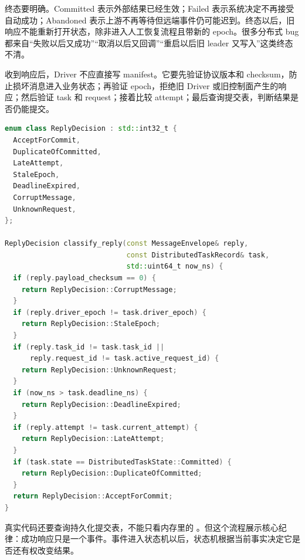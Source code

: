 终态要明确。Committed 表示外部结果已经生效；Failed 表示系统决定不再接受自动成功；Abandoned 表示上游不再等待但远端事件仍可能迟到。终态以后，旧响应不能重新打开状态，除非进入人工恢复流程且带新的 epoch。很多分布式 bug 都来自“失败以后又成功”“取消以后又回调”“重启以后旧 leader 又写入”这类终态不清。

收到响应后，Driver 不应直接写 manifest。它要先验证协议版本和 checksum，防止损坏消息进入业务状态；再验证 epoch，拒绝旧 Driver 或旧控制面产生的响应；然后验证 task 和 request；接着比较 attempt；最后查询提交表，判断结果是否仍能提交。

\begin{lstlisting}[language=C++,caption={响应进入状态机前的分类}]
enum class ReplyDecision : std::int32_t {
  AcceptForCommit,
  DuplicateOfCommitted,
  LateAttempt,
  StaleEpoch,
  DeadlineExpired,
  CorruptMessage,
  UnknownRequest,
};

ReplyDecision classify_reply(const MessageEnvelope& reply,
                             const DistributedTaskRecord& task,
                             std::uint64_t now_ns) {
  if (reply.payload_checksum == 0) {
    return ReplyDecision::CorruptMessage;
  }
  if (reply.driver_epoch != task.driver_epoch) {
    return ReplyDecision::StaleEpoch;
  }
  if (reply.task_id != task.task_id ||
      reply.request_id != task.active_request_id) {
    return ReplyDecision::UnknownRequest;
  }
  if (now_ns > task.deadline_ns) {
    return ReplyDecision::DeadlineExpired;
  }
  if (reply.attempt != task.current_attempt) {
    return ReplyDecision::LateAttempt;
  }
  if (task.state == DistributedTaskState::Committed) {
    return ReplyDecision::DuplicateOfCommitted;
  }
  return ReplyDecision::AcceptForCommit;
}
\end{lstlisting}

真实代码还要查询持久化提交表，不能只看内存里的 。但这个流程展示核心纪律：成功响应只是一个事件。事件进入状态机以后，状态机根据当前事实决定它是否还有权改变结果。

